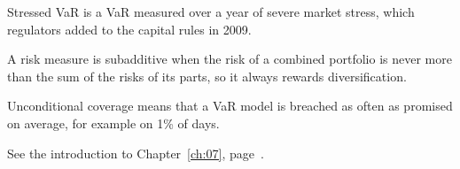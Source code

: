 \begin{keyterms}
\begin{description}[leftmargin=0pt, itemsep=2pt, parsep=0pt, font=\normalfont\bfseries\color{FEMaroon}]
  \item[Stressed VaR.] Stressed VaR is a VaR measured over a year of severe market stress, which regulators added to the capital rules in 2009.
  \item[Subadditive.] A risk measure is subadditive when the risk of a combined portfolio is never more than the sum of the risks of its parts, so it always rewards diversification.
  \item[Unconditional coverage.] Unconditional coverage means that a VaR model is breached as often as promised on average, for example on 1\% of days.
  \item[Value at Risk (VaR).] See the introduction to Chapter~\ref{ch:07}, page~\pageref{kt:value-at-risk}.
\end{description}
\end{keyterms}
